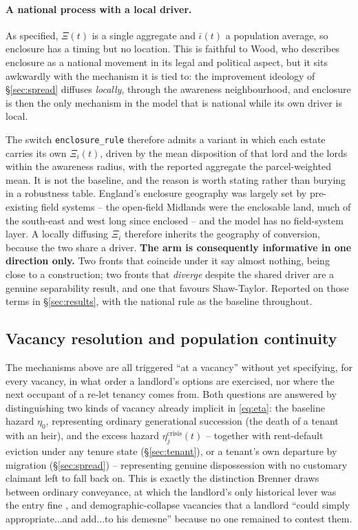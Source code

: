 \documentclass[11pt,english]{article}
\begin{document}
\paragraph{A national process with a local driver.} As specified, $\Xi(t)$ is a single aggregate and $\bar\iota(t)$ a population average, so enclosure has a timing but no location. This is faithful to Wood, who describes enclosure as a national movement in its legal and political aspect, but it sits awkwardly with the mechanism it is tied to: the improvement ideology of \S\ref{sec:spread} diffuses \emph{locally}, through the awareness neighbourhood, and enclosure is then the only mechanism in the model that is national while its own driver is local. 

The switch \texttt{enclosure\_rule} therefore admits a variant in which each estate carries its own $\Xi_i(t)$, driven by the mean disposition of that lord and the lords within the awareness radius, with the reported aggregate the parcel-weighted mean. It is not the baseline, and the reason is worth stating rather than burying in a robustness table. England's enclosure geography was largely set by pre-existing field systems -- the open-field Midlands were the enclosable land, much of the south-east and west long since enclosed -- and the model has no field-system layer. A locally diffusing $\Xi_i$ therefore inherits the geography of conversion, because the two share a driver. \textbf{The arm is consequently informative in one direction only.} Two fronts that coincide under it say almost nothing, being close to a construction; two fronts that \emph{diverge} despite the shared driver are a genuine separability result, and one that favours Shaw-Taylor. Reported on those terms in \S\ref{sec:results}, with the national rule as the baseline throughout.

\subsection{Vacancy resolution and population continuity}
\label{sec:vacancy}

The mechanisms above are all triggered ``at a vacancy'' without yet specifying, for every vacancy, in what order a landlord's options are exercised, nor where the next occupant of a re-let tenancy comes from. Both questions are answered by distinguishing two kinds of vacancy already implicit in \eqref{eq:eta}: the baseline hazard $\eta_0$, representing ordinary generational succession (the death of a tenant with an heir), and the excess hazard $\eta_j^{\text{crisis}}(t)$ -- together with rent-default eviction under any tenure state (\S\ref{sec:tenant}), or a tenant's own departure by migration (\S\ref{sec:spread}) -- representing genuine dispossession with no customary claimant left to fall back on. This is exactly the distinction Brenner draws between ordinary conveyance, at which the landlord's only historical lever was the entry fine \cite[p.62]{brenner1976agrarian}, and demographic-collapse vacancies that a landlord ``could simply appropriate...and add...to his demesne'' \cite[p.61]{brenner1976agrarian} because no one remained to contest them.
\end{document}
